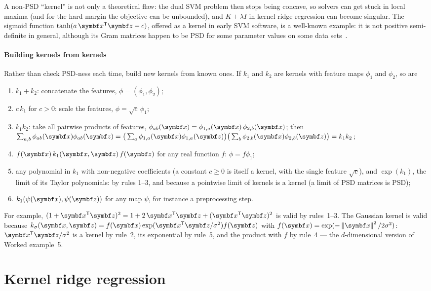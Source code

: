 \documentclass[11pt]{article}
\newcommand{\z}{\vect{z}}
\begin{document}
A non-PSD ``kernel'' is not only a theoretical flaw: the dual SVM problem then stops being concave, so solvers can get
stuck in local maxima (and for the hard margin the objective can be unbounded), and $K + \lambda I$ in kernel ridge
regression can become singular. The sigmoid function $\tanh(a\,\x\T\z + c)$, offered as a kernel in early SVM software,
is a well-known example: it is not positive semi-definite in general, although its Gram matrices happen to be PSD for
some parameter values on some data sets~\cite{scholkopf2002}.

\paragraph{Building kernels from kernels} Rather than check PSD-ness each time, build new kernels from known ones. If
$k_1$ and $k_2$ are kernels with feature maps $\phi_1$ and $\phi_2$, so are
\begin{enumerate}
\item $k_1 + k_2$: concatenate the features, $\phi = (\phi_1, \phi_2)$;
\item $c\,k_1$ for $c > 0$: scale the features, $\phi = \sqrt c\,\phi_1$;
\item $k_1 k_2$: take all pairwise products of features, $\phi_{ab}(\x) = \phi_{1,a}(\x)\,\phi_{2,b}(\x)$; then
  $\sum_{a,b}\phi_{ab}(\x)\phi_{ab}(\z) = \big(\sum_a \phi_{1,a}(\x)\phi_{1,a}(\z)\big)\big(\sum_b \phi_{2,b}(\x)\phi_{2,b}(\z)\big)
  = k_1k_2$;
\item $f(\x)\,k_1(\x, \z)\,f(\z)$ for any real function $f$: $\phi = f\phi_1$;
\item any polynomial in $k_1$ with non-negative coefficients (a constant $c \ge 0$ is itself a kernel, with the single
  feature $\sqrt c$), and $\exp(k_1)$, the limit of its Taylor polynomials: by rules 1--3, and because a pointwise limit of
  kernels is a kernel (a limit of PSD matrices is PSD);
\item $k_1(\psi(\x), \psi(\z))$ for any map $\psi$, for instance a preprocessing step.
\end{enumerate}
For example, $(1 + \x\T\z)^2 = 1 + 2\,\x\T\z + (\x\T\z)^2$ is valid by rules~1--3. The Gaussian kernel is valid because
$k_\sigma(\x, \z) = f(\x)\exp(\x\T\z/\sigma^2)f(\z)$ with $f(\x) = \exp(-\norm{\x}^2/2\sigma^2)$: $\x\T\z/\sigma^2$ is a
kernel by rule~2, its exponential by rule~5, and the product with $f$ by rule~4 --- the $d$-dimensional version of Worked
example~5.

\section{Kernel ridge regression}\label{sec:krr}
\end{document}
